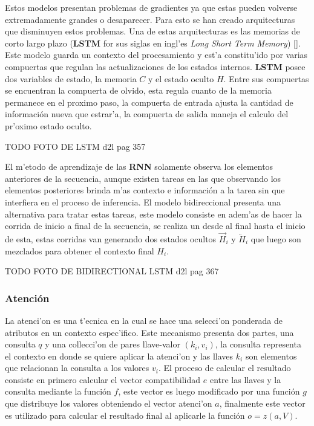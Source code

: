 Estos modelos presentan problemas de gradientes ya que estas pueden volverse extremadamente grandes o desaparecer.
Para esto se han creado arquitecturas que disminuyen estos problemas. Una de estas arquitecturas es las memorias
de corto largo plazo (\textbf{LSTM} for sus siglas en ingl'es \emph{Long Short Term Memory}) [\cite{TODO lstm}].
Este modelo guarda un contexto del procesamiento y est'a constitu'ido por varias compuertas que regulan las 
actualizaciones de los estados internos. \textbf{LSTM} posee dos variables de estado, la memoria $C$ y el estado 
oculto $H$. Entre sus compuertas se encuentran la compuerta de olvido, esta regula cuanto de la memoria permanece
en el proximo paso, la compuerta de entrada ajusta la cantidad de información nueva que estrar'a, la compuerta 
de salida maneja el calculo del pr'oximo estado oculto.

TODO FOTO DE LSTM d2l pag 357

El m'etodo de aprendizaje de las \textbf{RNN} solamente observa los elementos anteriores de la secuencia, aunque existen
tareas en las que observando los elementos posteriores brinda m'as contexto e información a la tarea sin que interfiera
en el proceso de inferencia. El modelo bidireccional presenta una alternativa para tratar estas tareas, este modelo
consiste en adem'as de hacer la corrida de inicio a final de la secuencia, se realiza un desde al final hasta el  
inicio de esta, estas corridas van generando dos estados ocultos $\overrightarrow{H}_{i}$ y $\overleftarrow{H}_{i}$
que luego son mezclados para obtener el contexto final $H_i$.

TODO FOTO DE BIDIRECTIONAL LSTM d2l pag 367

\subsubsection{Atención}

La atenci'on es una t'ecnica en la cual se hace una selecci'on ponderada de atributos en un contexto espec'ifico. 
Este mecanismo presenta dos partes, una consulta $q$ y una collecci'on de pares llave-valor $(k_i, v_i)$, la 
consulta representa el contexto en donde se quiere aplicar la atenci'on y las llaves $k_i$ son elementos que 
relacionan la consulta a los valores $v_i$. El proceso de calcular el resultado consiste en primero calcular 
el vector compatibilidad $e$ entre las llaves y la consulta mediante la función $f$, este vector es luego 
modificado por una función $g$ que distribuye los valores obteniendo el vector atenci'on $a$, finalmente 
este vector es utilizado para calcular el resultado final al aplicarle la función $o = z(a, V)$.

